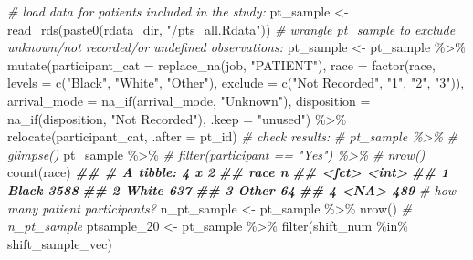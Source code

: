 \documentclass[
]{article}
\newenvironment{Shaded}{\begin{snugshade}}{\end{snugshade}}
\newcommand{\AttributeTok}[1]{\textcolor[rgb]{0.77,0.63,0.00}{#1}}
\newcommand{\CommentTok}[1]{\textcolor[rgb]{0.56,0.35,0.01}{\textit{#1}}}
\newcommand{\DocumentationTok}[1]{\textcolor[rgb]{0.56,0.35,0.01}{\textbf{\textit{#1}}}}
\newcommand{\FunctionTok}[1]{\textcolor[rgb]{0.00,0.00,0.00}{#1}}
\newcommand{\NormalTok}[1]{#1}
\newcommand{\OtherTok}[1]{\textcolor[rgb]{0.56,0.35,0.01}{#1}}
\newcommand{\SpecialCharTok}[1]{\textcolor[rgb]{0.00,0.00,0.00}{#1}}
\newcommand{\StringTok}[1]{\textcolor[rgb]{0.31,0.60,0.02}{#1}}
\begin{document}
\begin{Shaded}
\begin{Highlighting}[]
\CommentTok{\# load data for patients included in the study:}
\NormalTok{pt\_sample }\OtherTok{\textless{}{-}} \FunctionTok{read\_rds}\NormalTok{(}\FunctionTok{paste0}\NormalTok{(rdata\_dir, }\StringTok{"/pts\_all.Rdata"}\NormalTok{))}
\CommentTok{\# wrangle pt\_sample to exclude unknown/not recorded/or undefined observations:}
\NormalTok{pt\_sample }\OtherTok{\textless{}{-}}\NormalTok{ pt\_sample }\SpecialCharTok{\%\textgreater{}\%} 
  \FunctionTok{mutate}\NormalTok{(}\AttributeTok{participant\_cat =} \FunctionTok{replace\_na}\NormalTok{(job, }\StringTok{"PATIENT"}\NormalTok{), }
         \AttributeTok{race =} \FunctionTok{factor}\NormalTok{(race,}
              \AttributeTok{levels =} \FunctionTok{c}\NormalTok{(}\StringTok{"Black"}\NormalTok{,}
                         \StringTok{"White"}\NormalTok{,}
                         \StringTok{"Other"}\NormalTok{),}
              \AttributeTok{exclude =} \FunctionTok{c}\NormalTok{(}\StringTok{"Not Recorded"}\NormalTok{, }\StringTok{"1"}\NormalTok{, }\StringTok{"2"}\NormalTok{, }\StringTok{"3"}\NormalTok{)),}
         \AttributeTok{arrival\_mode =} \FunctionTok{na\_if}\NormalTok{(arrival\_mode, }\StringTok{"Unknown"}\NormalTok{),}
         \AttributeTok{disposition =} \FunctionTok{na\_if}\NormalTok{(disposition, }\StringTok{"Not Recorded"}\NormalTok{),}
         \AttributeTok{.keep =} \StringTok{"unused"}\NormalTok{) }\SpecialCharTok{\%\textgreater{}\%}
  \FunctionTok{relocate}\NormalTok{(participant\_cat, }\AttributeTok{.after =}\NormalTok{ pt\_id)}
\CommentTok{\# check results:}
\CommentTok{\# pt\_sample \%\textgreater{}\% }
\CommentTok{\#   glimpse()}
\NormalTok{pt\_sample }\SpecialCharTok{\%\textgreater{}\%} 
  \CommentTok{\# filter(participant == "Yes") \%\textgreater{}\%}
  \CommentTok{\# nrow()}
  \FunctionTok{count}\NormalTok{(race)}
\DocumentationTok{\#\# \# A tibble: 4 x 2}
\DocumentationTok{\#\#   race      n}
\DocumentationTok{\#\#   \textless{}fct\textgreater{} \textless{}int\textgreater{}}
\DocumentationTok{\#\# 1 Black  3588}
\DocumentationTok{\#\# 2 White   637}
\DocumentationTok{\#\# 3 Other    64}
\DocumentationTok{\#\# 4 \textless{}NA\textgreater{}    489}
\CommentTok{\# how many patient participants?}
\NormalTok{n\_pt\_sample }\OtherTok{\textless{}{-}}\NormalTok{ pt\_sample }\SpecialCharTok{\%\textgreater{}\%} 
  \FunctionTok{nrow}\NormalTok{()}
\CommentTok{\# n\_pt\_sample}
\NormalTok{ptsample\_20 }\OtherTok{\textless{}{-}}\NormalTok{   pt\_sample }\SpecialCharTok{\%\textgreater{}\%} 
  \FunctionTok{filter}\NormalTok{(shift\_num }\SpecialCharTok{\%in\%}\NormalTok{ shift\_sample\_vec)}


\end{Highlighting}
\end{Shaded}
\end{document}
